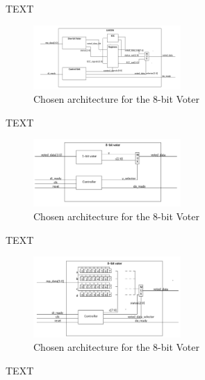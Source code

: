 \documentclass[a4paper]{IEEEtran}
\begin{document}
TEXT
\begin{figure}[h!]
  \centering
      \includegraphics[width=0.5\textwidth]{Figures/ArchitectureFinal}
  \caption{Chosen architecture for the 8-bit Voter}
  \label{fig:ArchitectureFinal}
\end{figure}
TEXT
\begin{figure}[h!]
  \centering
      \includegraphics[width=0.5\textwidth]{Figures/ArchitectureOption2}
  \caption{Chosen architecture for the 8-bit Voter}
  \label{fig:ArchitectureOption2}
\end{figure}
TEXT
\begin{figure}[h!]
  \centering
      \includegraphics[width=0.5\textwidth]{Figures/ArchitectureOption3}
  \caption{Chosen architecture for the 8-bit Voter}
  \label{fig:ArchitectureOption3}
\end{figure}

TEXT
\end{document}
